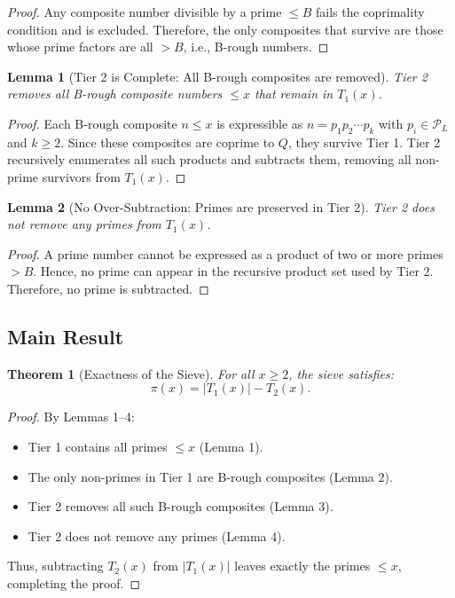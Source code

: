 \documentclass[11pt]{article}
\newtheorem{lemma}{Lemma}
\newtheorem{theorem}{Theorem}
\begin{document}
	\begin{proof}
		Any composite number divisible by a prime \( \leq B \) fails the coprimality condition and is excluded.  
		Therefore, the only composites that survive are those whose prime factors are all \( > B \), i.e., B-rough numbers.
	\end{proof}
	
	\begin{lemma}[Tier 2 is Complete: All B-rough composites are removed]
		Tier 2 removes all B-rough composite numbers \( \leq x \) that remain in \( T_1(x) \).
	\end{lemma}
	
	\begin{proof}
		Each B-rough composite \( n \leq x \) is expressible as \( n = p_1 p_2 \cdots p_k \) with \( p_i \in \mathcal{P}_L \) and \( k \geq 2 \).  
		Since these composites are coprime to \( Q \), they survive Tier 1.  
		Tier 2 recursively enumerates all such products and subtracts them, removing all non-prime survivors from \( T_1(x) \).
	\end{proof}
	
	\begin{lemma}[No Over-Subtraction: Primes are preserved in Tier 2]
		Tier 2 does not remove any primes from \( T_1(x) \).
	\end{lemma}
	
	\begin{proof}
		A prime number cannot be expressed as a product of two or more primes \( > B \).  
		Hence, no prime can appear in the recursive product set used by Tier 2.  
		Therefore, no prime is subtracted.
	\end{proof}
	
	\subsection{Main Result}
	
	\begin{theorem}[Exactness of the Sieve]
		For all \( x \geq 2 \), the sieve satisfies:
		\[
		\pi(x) = |T_1(x)| - T_2(x).
		\]
	\end{theorem}
	
	\begin{proof}
		By Lemmas 1–4:
		\begin{itemize}
			\item Tier 1 contains all primes \( \leq x \) (Lemma 1).
			\item The only non-primes in Tier 1 are B-rough composites (Lemma 2).
			\item Tier 2 removes all such B-rough composites (Lemma 3).
			\item Tier 2 does not remove any primes (Lemma 4).
		\end{itemize}
		Thus, subtracting \( T_2(x) \) from \( |T_1(x)| \) leaves exactly the primes \( \leq x \), completing the proof.
	\end{proof}
	
\end{document}
